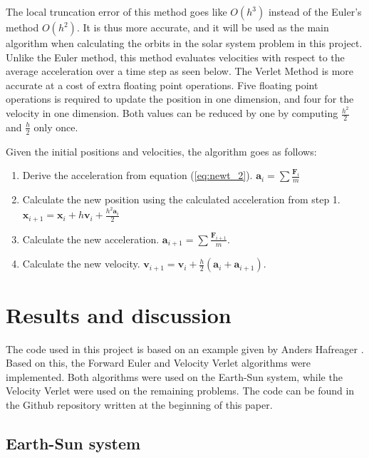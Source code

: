 \documentclass[10pt,a4paper,titlepage]{article}
\begin{document}
The local truncation error of this method goes like $O(h^3)$ instead of the Euler's method $O(h^2)$. It is thus more accurate, and it will be used as the main algorithm when calculating the orbits in the solar system problem in this project. Unlike the Euler method, this method evaluates velocities with respect to the average acceleration over a time step as seen below. The Verlet Method is more accurate at a cost of extra floating point operations. Five floating point operations is required to update the position in one dimension, and four for the velocity in one dimension. Both values can be reduced by one by computing $\frac{h^2}{2}$ and $\frac{h}{2}$ only once. 

Given the initial positions and velocities, the algorithm goes as follows:
\begin{enumerate}%
\item Derive the acceleration from equation (\ref{eq:newt_2}).
\newline $\mathbf{a}_i=\sum\frac{\mathbf{F}_{i}}{m}$
\item Calculate the new position using the calculated acceleration from step 1. \newline
$\mathbf{x}_{i+1}=\mathbf{x}_i+h\mathbf{v}_i + \frac{h^2\mathbf{a}_i}{2}$
\item Calculate the new acceleration. \newline
\newline $\mathbf{a}_{i+1}=\sum\frac{\mathbf{F}_{i+1}}{m}$.
\item Calculate the new velocity. \newline
$\mathbf{v}_{i+1}=\mathbf{v}_i+\frac{h}{2}(\mathbf{a}_i+\mathbf{a}_{i+1})$.
\end{enumerate}


\section{Results and discussion}
The code used in this project is based on an example given by Anders Hafreager \cite{Hafr}. Based on this, the Forward Euler and Velocity Verlet algorithms were implemented. Both algorithms were used on the Earth-Sun system, while the Velocity Verlet were used on the remaining problems. The code can be found in the Github repository written at the beginning of this paper. 
 
\subsection{Earth-Sun system}
\end{document}
